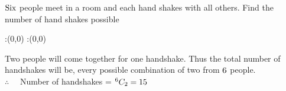 



\question[4] $\text{Six}$ people meet in a room and each hand shakes with all others. Find the number of hand shakes possible  


\watchout

\ifprintanswers
  \begin{marginfigure}
      :(0,0)
      :(0,0)
    \figdrawbegin{}
      \figdrawline [100,101]
    \figdrawend
    \figvisu{\figBoxA}{}{%
    }
    \centerline{\box\figBoxA}
  \end{marginfigure}
\fi 

\begin{solution}[\mcq]
Two people will come together for one handshake. Thus the total number of handshakes will be, every possible combination of two from $6$ people. \\
$\therefore \quad$ Number of handshakes = $^{6}C_{2} = 15$ 
\end{solution}

